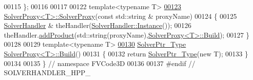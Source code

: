\begin{DoxyCode}
00115 \};
00116 
00117 
00122 \textcolor{keyword}{template}<\textcolor{keyword}{typename} T>
\hypertarget{SolverHandler_8hpp_source.tex_l00123}{}\hyperlink{classFVCode3D_1_1SolverProxy_afe54aee3037758e492733076dcc71713}{00123} \hyperlink{classFVCode3D_1_1SolverProxy_a5c2f01250efd16636698aa0ee8d59df6}{SolverProxy<T>::SolverProxy}(\textcolor{keyword}{const} std::string & proxyName)
00124 \{
00125     \hyperlink{classFVCode3D_1_1SolverHandler}{SolverHandler} & theHandler(\hyperlink{classFVCode3D_1_1SolverHandler_ada712461029e9fdf623260937afe4da3}{SolverHandler::Instance}());
00126     theHandler.\hyperlink{classFVCode3D_1_1SolverHandler_a2d1850e99d392d23fa2a492e0b55ab08}{addProduct}(std::string(proxyName),\hyperlink{classFVCode3D_1_1SolverProxy}{SolverProxy<T>::Build});
00127 \}
00128 
00129 \textcolor{keyword}{template}<\textcolor{keyword}{typename} T>
\hypertarget{SolverHandler_8hpp_source.tex_l00130}{}\hyperlink{classFVCode3D_1_1SolverProxy_ae8b9170e0a77b713f7f689a5c406b993}{00130} \hyperlink{namespaceFVCode3D_a0b32227a4e5847c2fb27215fb81d9363}{SolverPtr\_Type} \hyperlink{classFVCode3D_1_1SolverProxy_ae8b9170e0a77b713f7f689a5c406b993}{SolverProxy<T>::Build}()
00131 \{
00132     \textcolor{keywordflow}{return} \hyperlink{namespaceFVCode3D_a0b32227a4e5847c2fb27215fb81d9363}{SolverPtr\_Type}(\textcolor{keyword}{new} T);
00133 \}
00134 
00135 \} \textcolor{comment}{// namespace FVCode3D}
00136 
00137 \textcolor{preprocessor}{#endif // SOLVERHANDLER\_HPP\_}
\end{DoxyCode}
